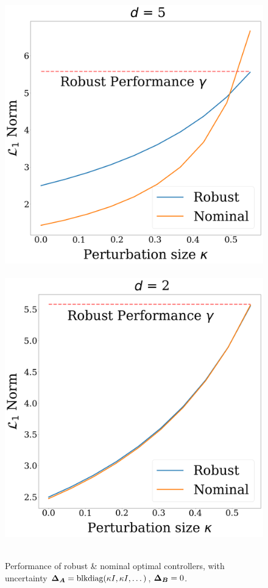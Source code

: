 \begin{figure}
\centering
~\includegraphics[width=.45\columnwidth]{d5.png}~\includegraphics[width=.45\columnwidth]{d2.png}~
\caption{Performance of robust \& nominal optimal controllers, with uncertainty  ${\boldsymbol{\Delta}}_{\boldsymbol{A}} = \mathrm{blkdiag}(\kappa I, \kappa I, \dots)$, ${\boldsymbol{\Delta}}_{\boldsymbol{B}} = 0$. }%
\label{fig:kappa}
\end{figure}


